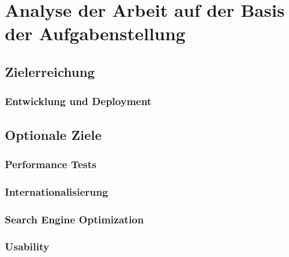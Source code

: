 
\chapter{Analyse der Arbeit auf der Basis der Aufgabenstellung}
\section{Zielerreichung}
\subsection{Entwicklung und Deployment}

\section{Optionale Ziele}

\subsection{Performance Tests}

\subsection{Internationalisierung}

\subsection{Search Engine Optimization}

\subsection{Usability}

